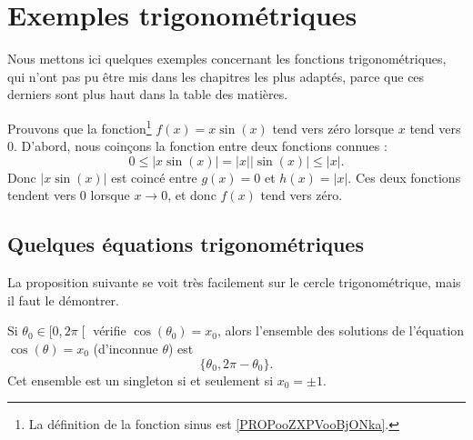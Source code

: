 \section{Exemples trigonométriques}

Nous mettons ici quelques exemples concernant les fonctions trigonométriques, qui n'ont pas pu être mis dans les chapitres les plus adaptés, parce que ces derniers sont plus haut dans la table des matières.

\begin{example}     \label{EXooSPFDooSluUGV}
	Prouvons que la fonction\footnote{La définition de la fonction sinus est \ref{PROPooZXPVooBjONka}.} $f(x)=x\sin(x)$ tend vers zéro lorsque $x$ tend vers $0$. D'abord, nous coinçons la fonction entre deux fonctions connues :
	\begin{equation}
		0\leq| x\sin(x) |=| x | |\sin(x) |\leq | x |.
	\end{equation}
	Donc $| x\sin(x) |$ est coincé entre $g(x)=0$ et $h(x)=| x |$. Ces deux fonctions tendent vers $0$ lorsque $x\to 0$, et donc $f(x)$ tend vers zéro.
\end{example}

\subsection{Quelques équations trigonométriques}

La proposition suivante se voit très facilement sur le cercle trigonométrique, mais il faut le démontrer.
\begin{proposition}     \label{PROPooTUUUooVrAGQo}
	Si \( \theta_0\in \mathopen[ 0 , 2\pi \mathclose[\) vérifie \( \cos(\theta_0)=x_0\), alors l'ensemble des solutions de l'équation \( \cos(\theta)=x_0\) (d'inconnue \( \theta\)) est
	\begin{equation}
		\{ \theta_0,2\pi-\theta_0 \}.
	\end{equation}
	Cet ensemble est un singleton si et seulement si \( x_0=\pm1\).
\end{proposition}

